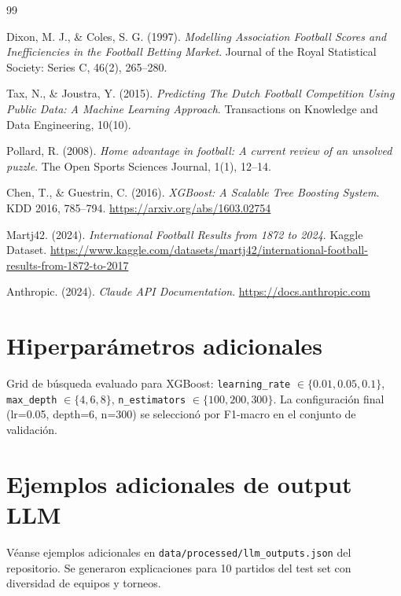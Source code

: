 \documentclass[10pt,twocolumn]{article}
\begin{document}
\begin{thebibliography}{99}

Dixon, M. J., \& Coles, S. G. (1997).
\textit{Modelling Association Football Scores and Inefficiencies in the
Football Betting Market}.
Journal of the Royal Statistical Society: Series C, 46(2), 265--280.

Tax, N., \& Joustra, Y. (2015).
\textit{Predicting The Dutch Football Competition Using Public Data:
A Machine Learning Approach}.
Transactions on Knowledge and Data Engineering, 10(10).

Pollard, R. (2008).
\textit{Home advantage in football: A current review of an unsolved puzzle}.
The Open Sports Sciences Journal, 1(1), 12--14.

Chen, T., \& Guestrin, C. (2016).
\textit{XGBoost: A Scalable Tree Boosting System}.
KDD 2016, 785--794.
\url{https://arxiv.org/abs/1603.02754}

Martj42. (2024).
\textit{International Football Results from 1872 to 2024}.
Kaggle Dataset.
\url{https://www.kaggle.com/datasets/martj42/international-football-results-from-1872-to-2017}

Anthropic. (2024).
\textit{Claude API Documentation}.
\url{https://docs.anthropic.com}

\end{thebibliography}

\appendix

\section{Hiperparámetros adicionales}

Grid de búsqueda evaluado para XGBoost:
\texttt{learning\_rate} $\in \{0.01, 0.05, 0.1\}$,
\texttt{max\_depth} $\in \{4, 6, 8\}$,
\texttt{n\_estimators} $\in \{100, 200, 300\}$.
La configuración final (lr=0.05, depth=6, n=300) se seleccionó
por F1-macro en el conjunto de validación.

\section{Ejemplos adicionales de output LLM}

Véanse ejemplos adicionales en \texttt{data/processed/llm\_outputs.json}
del repositorio. Se generaron explicaciones para 10 partidos del
test set con diversidad de equipos y torneos.
\end{document}
